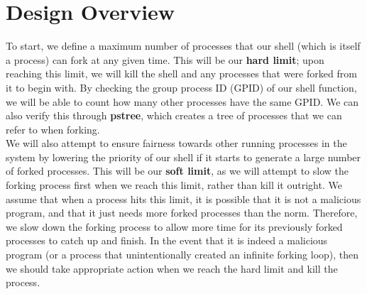 \documentclass{article}
\begin{document}
 

\section{Design Overview}

To start, we define a maximum number of processes that our shell (which is 
itself a process) can fork at any given time. This will be our \textbf{hard  
limit}; upon reaching this limit, we will kill the shell and any processes that
were forked from it to begin with. By checking the group process ID (GPID) of 
our shell function, we will be able to count how many other processes have the 
same GPID. We can also verify this through \textbf{pstree}, which creates a
tree of processes that we can refer to when forking. \\
We will also attempt to ensure fairness towards other running processes in the
system by lowering the priority of our shell if it starts to generate a large
number of forked processes. This will be our \textbf{soft limit}, as we will
attempt to slow the forking process first when we reach this limit, rather 
than kill it outright. We assume that when a process hits this limit, it is
possible that it is not a malicious program, and that it just needs more forked
processes than the norm. Therefore, we slow down the forking process to allow 
more time for its previously forked processes to catch up and finish. In the
event that it is indeed a malicious program (or a process that unintentionally 
created an infinite forking loop), then we should take appropriate action when 
we reach the hard limit and kill the process. \\
\end{document}
